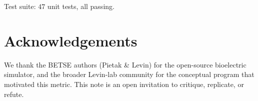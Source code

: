 \documentclass[11pt,a4paper]{article}
\begin{document}
Test suite: $47$ unit tests, all passing.

\section*{Acknowledgements}

We thank the BETSE authors (Pietak \& Levin) for the open-source bioelectric simulator, and the broader Levin-lab community for the conceptual program that motivated this metric. This note is an open invitation to critique, replicate, or refute.



\end{document}
